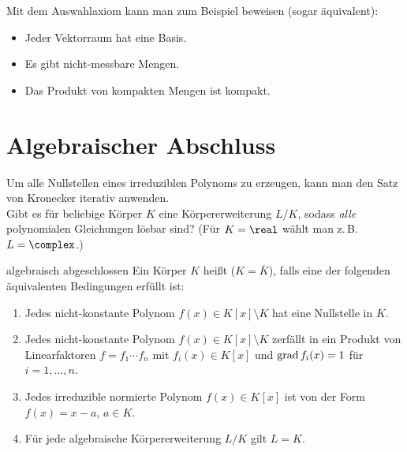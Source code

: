 \begin{Bsp}
    Mit dem Auswahlaxiom kann man zum Beispiel beweisen
    (sogar äquivalent):
    \begin{itemize}
        \item
        Jeder Vektorraum hat eine Basis.

        \item
        Es gibt nicht-messbare Mengen.

        \item
        Das Produkt von kompakten Mengen ist kompakt.
    \end{itemize}
\end{Bsp}

\pagebreak

\section{%
    Algebraischer Abschluss%
}

\begin{Bem}
    Um alle Nullstellen eines irreduziblen Polynoms zu erzeugen, kann
    man den Satz von Kronecker iterativ anwenden.\\
    Gibt es für beliebige Körper $K$ eine Körpererweiterung $L/K$, sodass
    \emph{alle} polynomialen Gleichungen lösbar sind?
    (Für $K = \real$ wählt man z.\,B. $L = \complex$.)
\end{Bem}

\begin{Def}{algebraisch abgeschlossen}
    Ein Körper $K$ heißt 
    ($K = \overline{K}$), falls eine der folgenden äquivalenten
    Bedingungen erfüllt ist:
    \begin{enumerate}[label=(\alph*)]
        \item
        Jedes nicht-konstante Polynom $f(x) \in K[x] \setminus K$ hat eine
        Nullstelle in $K$.

        \item
        Jedes nicht-konstante Polynom $f(x) \in K[x] \setminus K$ zerfällt in
        ein Produkt von Linearfaktoren $f = f_1 \dotsm f_n$ mit
        $f_i(x) \in K[x]$ und $\operatorname{grad} f_i(x) = 1$ für $i = 1, \dotsc, n$.

        \item
        Jedes irreduzible normierte Polynom $f(x) \in K[x]$ ist von der Form
        $f(x) = x - a$, $a \in K$.

        \item
        Für jede algebraische Körpererweiterung $L/K$ gilt $L = K$.
    \end{enumerate}
\end{Def}

